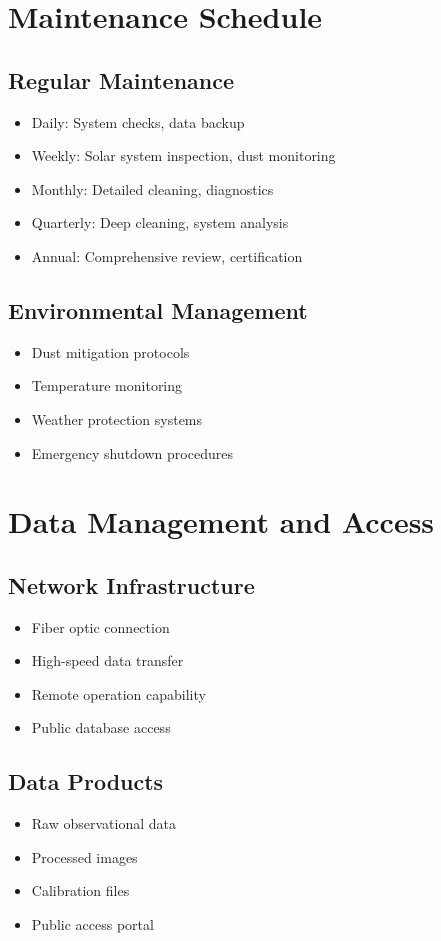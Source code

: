 \documentclass{article}
\begin{document}
\section{Maintenance Schedule}

\subsection{Regular Maintenance}
\begin{itemize}
    \item Daily: System checks, data backup
    \item Weekly: Solar system inspection, dust monitoring
    \item Monthly: Detailed cleaning, diagnostics
    \item Quarterly: Deep cleaning, system analysis
    \item Annual: Comprehensive review, certification
\end{itemize}

\subsection{Environmental Management}
\begin{itemize}
    \item Dust mitigation protocols
    \item Temperature monitoring
    \item Weather protection systems
    \item Emergency shutdown procedures
\end{itemize}

\section{Data Management and Access}

\subsection{Network Infrastructure}
\begin{itemize}
    \item Fiber optic connection
    \item High-speed data transfer
    \item Remote operation capability
    \item Public database access
\end{itemize}

\subsection{Data Products}
\begin{itemize}
    \item Raw observational data
    \item Processed images
    \item Calibration files
    \item Public access portal
\end{itemize}
\end{document}
